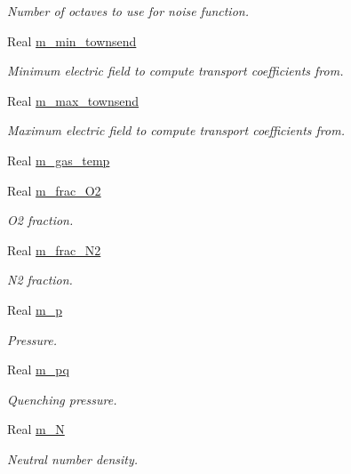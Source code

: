 \begin{DoxyCompactItemize}
\begin{DoxyCompactList}\small\item\em Number of octaves to use for noise function. \end{DoxyCompactList}\item 
Real \hyperlink{classair__bolsig_a8ab953df21589ed6892d0fbbf2a0fda8}{m\+\_\+min\+\_\+townsend}
\begin{DoxyCompactList}\small\item\em Minimum electric field to compute transport coefficients from. \end{DoxyCompactList}\item 
Real \hyperlink{classair__bolsig_a8a3ee4798568377c489b2e5b33c7f0ff}{m\+\_\+max\+\_\+townsend}
\begin{DoxyCompactList}\small\item\em Maximum electric field to compute transport coefficients from. \end{DoxyCompactList}\item 
Real \hyperlink{classair__bolsig_abf9206e5a2799dc3e20d143e51114ca8}{m\+\_\+gas\+\_\+temp}
\item 
Real \hyperlink{classair__bolsig_a6b013ecc6ffcaf4fe641f7ce17ddd44d}{m\+\_\+frac\+\_\+\+O2}
\begin{DoxyCompactList}\small\item\em O2 fraction. \end{DoxyCompactList}\item 
Real \hyperlink{classair__bolsig_a45ba35b6821761397f767836548b89ad}{m\+\_\+frac\+\_\+\+N2}
\begin{DoxyCompactList}\small\item\em N2 fraction. \end{DoxyCompactList}\item 
Real \hyperlink{classair__bolsig_a7055727a92e7ffdb0a82a42dd229888c}{m\+\_\+p}
\begin{DoxyCompactList}\small\item\em Pressure. \end{DoxyCompactList}\item 
Real \hyperlink{classair__bolsig_a554b273425dd186393461759096283ef}{m\+\_\+pq}
\begin{DoxyCompactList}\small\item\em Quenching pressure. \end{DoxyCompactList}\item 
Real \hyperlink{classair__bolsig_a2d8bde5d91ec3e6693a3c569f634e102}{m\+\_\+N}
\begin{DoxyCompactList}\small\item\em Neutral number density. \end{DoxyCompactList}\item 

\end{DoxyCompactItemize}

